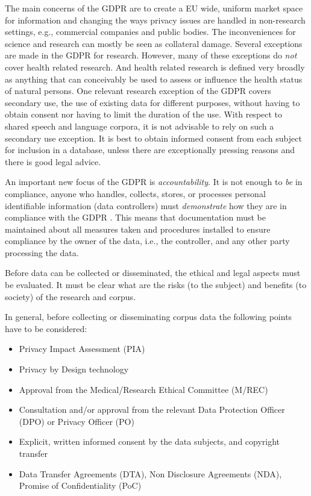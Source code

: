 \documentclass[10pt, a4paper]{article}
\begin{document}
The main concerns of the GDPR are to create a EU wide, uniform market space for information and changing the ways privacy issues are handled in non-research settings, e.g., commercial companies and public bodies. The inconveniences for science and research can mostly be seen as collateral damage. Several exceptions are made in the GDPR for research. However, many of these exceptions do \emph{not} cover health related research. And health related research is defined very broadly as anything that can conceivably be used to assess or influence the health status of natural persons. One relevant research exception of the GDPR covers secondary use, the use of existing data for different purposes, without having to obtain consent nor having to limit the duration of the use. With respect to shared speech and language corpora, it is not advisable to rely on such a secondary use exception. It is best to obtain informed consent from each subject for inclusion in a database, unless there are exceptionally pressing reasons and there is good legal advice.

An important new focus of the GDPR is \emph{accountability}. It is not enough to \emph{be} in compliance, anyone who handles, collects, stores, or processes personal identifiable information (data controllers) must \emph{demonstrate} how they are in compliance with the GDPR \cite{AllenOvery2016GDPR,Art29DPWP,IAPP2016Top10}. This means that documentation must be maintained about all measures taken and procedures installed to ensure compliance by the owner of the data, i.e., the controller, and any other party processing the data.

Before data can be collected or disseminated, the ethical and legal aspects must be evaluated. It must be clear what are the risks (to the subject) and benefits (to society) of the research and corpus.

\noindent In general, before collecting or disseminating corpus data the following points have to be considered:
\begin{itemize}
\item Privacy Impact Assessment (PIA)
\item Privacy by Design technology
\item Approval from the Medical/Research Ethical Committee (M/REC)
\item Consultation and/or approval from the relevant Data Protection Officer (DPO) or Privacy Officer (PO)
\item Explicit, written informed consent by the data subjects, and copyright transfer
\item Data Transfer Agreements (DTA), Non Disclosure Agreements (NDA), Promise of Confidentiality (PoC)
\end{itemize}
\end{document}
